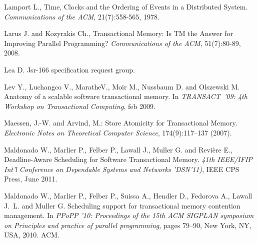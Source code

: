 \begin{thebibliography}{99}
{
Lamport L., 
Time, Clocks and the Ordering of Events in a Distributed System.
{\em Communications  of the ACM}, 21(7):558-565, 1978.



Larus J. and Kozyrakis Ch., 
Transactional Memory: Is TM the Answer for Improving Parallel Programming?
{\it Communications of the ACM}, 51(7):80-89, 2008. 


Lea D.
\newblock Jsr-166 specification request group.


Lev Y., Luchangco V., MaratheV., Moir M., Nussbaum D. and
  Olszewski M.
\newblock Anatomy of a scalable software transactional memory.
\newblock In {\em TRANSACT~'09: 4th Workshop on Transactional Computing}, feb
  2009.



 Maessen, J.-W. and Arvind, M.:
 Store Atomicity for Transactional Memory. 
{\it Electronic  Notes  on Theoretical  Computer Science}, 
174(9):117--137 (2007).



Maldonado W.,  Marlier P., Felber P.,  Lawall J., Muller G. and Revi\`ere E., 
Deadline-Aware Scheduling for Software Transactional Memory. 
{\it 41th  IEEE/IFIP Int'l  Conference on  Dependable  Systems and Networks
'DSN'11)}, IEEE CPS Press, June 2011. 


Maldonado W., Marlier P., Felber P., Suissa A., Hendler D.,
  Fedorova A., Lawall J.~L. and Muller G.
\newblock Scheduling support for transactional memory contention management.
\newblock In {\em PPoPP '10: Proceedings of the 15th ACM SIGPLAN symposium on
  Principles and practice of parallel programming}, pages 79--90, New York, NY,
  USA, 2010. ACM.



}
\end{thebibliography}
